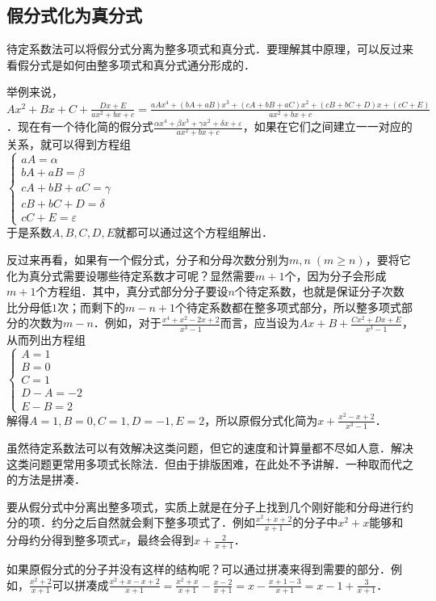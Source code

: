 \documentclass{ctexbook}
\begin{document}
\subsection{假分式化为真分式}
待定系数法可以将假分式分离为整多项式和真分式．要理解其中原理，可以反过来看假分式是如何由整多项式和真分式通分形成的．\par
举例来说，$Ax^{2}+Bx+C+\frac{Dx+E}{ax^{2}+bx+c}=\frac{aAx^{4}+\left(bA+aB\right)x^{3}+\left(cA+bB+aC\right)x^{2}+\left(cB+bC+D\right)x+\left(cC+E\right)}{ax^{2}+bx+c}$．现在有一个待化简的假分式$\frac{\alpha x^{4}+\beta x^{3}+\gamma x^{2}+\delta x+\varepsilon}{ax^{2}+bx+c}$，如果在它们之间建立一一对应的关系，就可以得到方程组\\
$\begin{cases}aA=\alpha\\bA+aB=\beta\\cA+bB+aC=\gamma\\cB+bC+D=\delta\\cC+E=\varepsilon\end{cases}$\\
于是系数$A,B,C,D,E$就都可以通过这个方程组解出．\par
反过来再看，如果有一个假分式，分子和分母次数分别为$m,n\;\left(m\ge n\right)$，要将它化为真分式需要设哪些待定系数才可呢？显然需要$m+1$个，因为分子会形成$m+1$个方程组．其中，真分式部分分子要设$n$个待定系数，也就是保证分子次数比分母低$1$次；而剩下的$m-n+1$个待定系数都在整多项式部分，所以整多项式部分的次数为$m-n$．例如，对于$\frac{x^{4}+x^{2}-2x+2}{x^{3}-1}$而言，应当设为$Ax+B+\frac{Cx^{2}+Dx+E}{x^{3}-1}$，从而列出方程组\\
$\begin{cases}A=1\\B=0\\C=1\\D-A=-2\\E-B=2\end{cases}$\\
解得$A=1,B=0,C=1,D=-1,E=2$，所以原假分式化简为$x+\frac{x^{2}-x+2}{x^{3}-1}$．\par
虽然待定系数法可以有效解决这类问题，但它的速度和计算量都不尽如人意．解决这类问题更常用多项式长除法．但由于排版困难，在此处不予讲解．一种取而代之的方法是拼凑．\par
要从假分式中分离出整多项式，实质上就是在分子上找到几个刚好能和分母进行约分的项．约分之后自然就会剩下整多项式了．例如$\frac{x^{2}+x+2}{x+1}$的分子中$x^{2}+x$能够和分母约分得到整多项式$x$，最终会得到$x+\frac{2}{x+1}$．\par
如果原假分式的分子并没有这样的结构呢？可以通过拼凑来得到需要的部分．例如，$\frac{x^{2}+2}{x+1}$可以拼凑成$\frac{x^{2}+x-x+2}{x+1}=\frac{x^{2}+x}{x+1}-\frac{x-2}{x+1}=x-\frac{x+1-3}{x+1}=x-1+\frac{3}{x+1}$．\par
\end{document}
